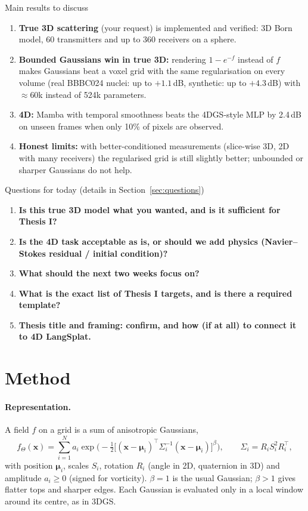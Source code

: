 \documentclass[11pt,a4paper]{article}
\newcommand{\ask}[1]{\textbf{\textcolor{orange!75!black}{#1}}}
\newcommand{\vect}[1]{\bm{#1}}
\begin{document}
\begin{keybox}{Main results to discuss}
\begin{enumerate}[leftmargin=*]
\item \textbf{True 3D scattering} (your request) is implemented and verified: 3D Born model, 60 transmitters and up
to 360 receivers on a sphere.
\item \textbf{Bounded Gaussians win in true 3D:} rendering $1-e^{-f}$ instead of $f$ makes Gaussians beat a voxel grid
with the same regularisation on every volume (real BBBC024 nuclei: up to $+1.1$\,dB, synthetic: up to $+4.3$\,dB) with
$\approx$60k instead of 524k parameters.
\item \textbf{4D:} Mamba with temporal smoothness beats the 4DGS-style MLP by 2.4\,dB on unseen frames when only 10\%
of pixels are observed.
\item \textbf{Honest limits:} with better-conditioned measurements (slice-wise 3D, 2D with many receivers) the
regularised grid is still slightly better; unbounded or sharper Gaussians do not help.
\end{enumerate}
\end{keybox}

\begin{qbox}{Questions for today (details in Section~\ref{sec:questions})}
\begin{enumerate}[leftmargin=*]
\item \ask{Is this true 3D model what you wanted, and is it sufficient for Thesis I?}
\item \ask{Is the 4D task acceptable as is, or should we add physics (Navier--Stokes residual / initial condition)?}
\item \ask{What should the next two weeks focus on?}
\item \ask{What is the exact list of Thesis I targets, and is there a required template?}
\item \ask{Thesis title and framing: confirm, and how (if at all) to connect it to 4D LangSplat.}
\end{enumerate}
\end{qbox}

\section{Method}
\paragraph{Representation.} A field $f$ on a grid is a sum of anisotropic Gaussians,
\begin{equation}
f_\Theta(\vect{x}) = \sum_{i=1}^{N} a_i \exp\!\Big(-\tfrac12\big[(\vect{x}-\vect{\mu}_i)^\top \Sigma_i^{-1}(\vect{x}-\vect{\mu}_i)\big]^{\beta}\Big),
\qquad \Sigma_i = R_i S_i^2 R_i^\top ,
\end{equation}
with position $\vect{\mu}_i$, scales $S_i$, rotation $R_i$ (angle in 2D, quaternion in 3D) and amplitude $a_i\ge0$
(signed for vorticity). $\beta=1$ is the usual Gaussian; $\beta>1$ gives flatter tops and sharper edges. Each
Gaussian is evaluated only in a local window around its centre, as in 3DGS.
\end{document}
